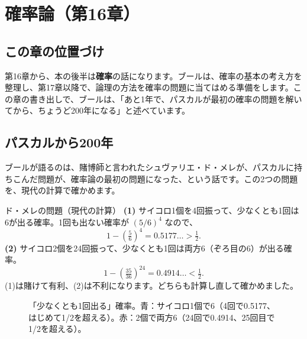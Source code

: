\documentclass[a4paper,11pt,openany]{ltjsbook}
\begin{document}
\chapter{確率論（第16章）}

\section{この章の位置づけ}

第16章から、本の後半は\textbf{確率}の話になります。ブールは、確率の基本の考え方を整理し、第17章以降で、論理の方法を確率の問題に当てはめる準備をします。この章の書き出しで、ブールは、「あと1年で、パスカルが最初の確率の問題を解いてから、ちょうど200年になる」と述べています。

\section{パスカルから200年}

ブールが語るのは、賭博師と言われたシュヴァリエ・ド・メレが、パスカルに持ちこんだ問題が、確率論の最初の問題になった、という話です。この2つの問題を、現代の計算で確かめます。

\begin{examplebox}{ド・メレの問題（現代の計算）}
\textbf{(1)} サイコロ1個を4回振って、少なくとも1回は6が出る確率。1回も出ない確率が $(5/6)^4$ なので、
\[
1-\left(\tfrac56\right)^4=0.5177\ldots>\tfrac12 .
\]
\textbf{(2)} サイコロ2個を24回振って、少なくとも1回は両方6（ぞろ目の6）が出る確率。
\[
1-\left(\tfrac{35}{36}\right)^{24}=0.4914\ldots<\tfrac12 .
\]
(1)は賭けて有利、(2)は不利になります。どちらも計算し直して確かめました。
\end{examplebox}

\begin{figure}[htbp]
\centering
{}
\caption{「少なくとも1回出る」確率。青：サイコロ1個で6（4回で0.5177、はじめて1/2を超える）。赤：2個で両方6（24回で0.4914、25回目で1/2を超える）。}
\end{figure}
\end{document}
